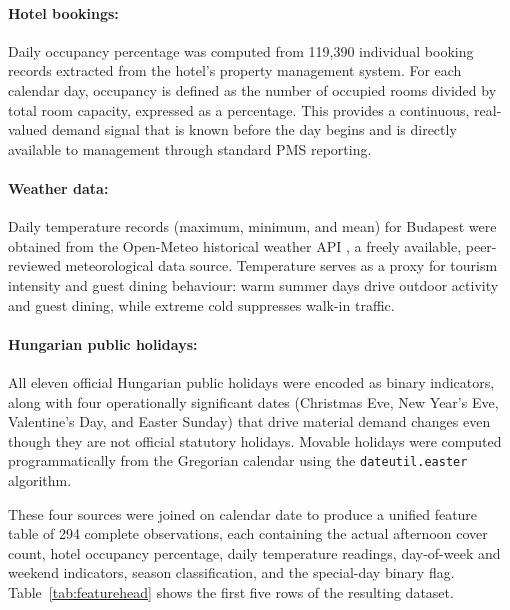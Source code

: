 \documentclass[12pt,a4paper,oneside]{article}
\begin{document}
\paragraph{Hotel bookings:} Daily occupancy percentage was computed from 119,390 individual booking records extracted from the hotel's property management system. For each calendar day, occupancy is defined as the number of occupied rooms divided by total room capacity, expressed as a percentage. This provides a continuous, real-valued demand signal that is known before the day begins and is directly available to management through standard PMS reporting.

\paragraph{Weather data:} Daily temperature records (maximum, minimum, and mean) for Budapest were obtained from the Open-Meteo historical weather API \citep{openmeteo2023}, a freely available, peer-reviewed meteorological data source. Temperature serves as a proxy for tourism intensity and guest dining behaviour: warm summer days drive outdoor activity and guest dining, while extreme cold suppresses walk-in traffic.

\paragraph{Hungarian public holidays:} All eleven official Hungarian public holidays were encoded as binary indicators, along with four operationally significant dates (Christmas Eve, New Year's Eve, Valentine's Day, and Easter Sunday) that drive material demand changes even though they are not official statutory holidays. Movable holidays were computed programmatically from the Gregorian calendar using the \texttt{dateutil.easter} algorithm.

These four sources were joined on calendar date to produce a unified feature table of 294 complete observations, each containing the actual afternoon cover count, hotel occupancy percentage, daily temperature readings, day-of-week and weekend indicators, season classification, and the special-day binary flag. Table~\ref{tab:featurehead} shows the first five rows of the resulting dataset.
\end{document}
